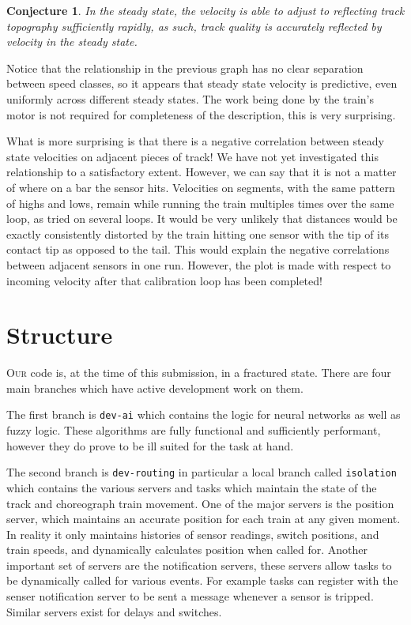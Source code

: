 \documentclass{amsart}
\newtheorem{conj}[theorem]{Conjecture}
\begin{document}
\begin{conj}
In the steady state, the velocity is able to adjust to reflecting track topography sufficiently rapidly, as such, track quality is accurately reflected by velocity in the steady state.
\end{conj}

Notice that the relationship in the previous graph has no clear separation between speed classes, so it appears that steady state velocity is predictive, even uniformly across different steady states. The work being done by the train's motor is not required for completeness of the description, this is very surprising.

What is more surprising is that there is a negative correlation between steady state velocities on adjacent pieces of track! We have not yet investigated this relationship to a satisfactory extent. However, we can say that it is not a matter of where on a bar the sensor hits. Velocities on segments, with the same pattern of highs and lows, remain while running the train multiples times over the same loop, as tried on several loops. It would be very unlikely that distances would be exactly consistently distorted by the train hitting one sensor with the tip of its contact tip as opposed to the tail. This would explain the negative correlations between adjacent sensors in one run. However, the plot is made with respect to incoming velocity after that calibration loop has been completed! 


\clearpage

\section*{Structure}

\textsc{Our} code is, at the time of this submission, in a fractured state.
There are four main branches which have active development work on them.

The first branch is \texttt{dev-ai} which contains the logic for neural networks
as well as fuzzy logic. These algorithms are fully functional and sufficiently
performant, however they do prove to be ill suited for the task at hand.

The second branch is \texttt{dev-routing} in particular a local branch called
\texttt{isolation} which contains the various servers and tasks which maintain
the state of the track and choreograph train movement. One of the major servers
is the position server, which maintains an accurate position for each train at
any given moment. In reality it only maintains histories of sensor readings,
switch positions, and train speeds, and dynamically calculates position when
called for. Another important set of servers are the notification servers, these
servers allow tasks to be dynamically called for various events. For example
tasks can register with the senser notification server to be sent a message
whenever a sensor is tripped. Similar servers exist for delays and switches.
\end{document}
